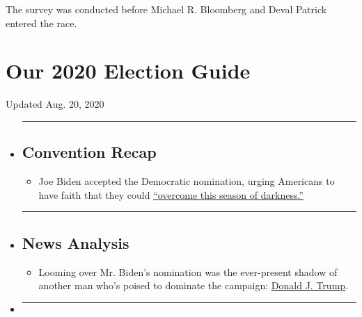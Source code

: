 The survey was conducted before Michael R. Bloomberg and Deval Patrick
entered the race.

\hypertarget{our-2020-election-guide}{%
\section{Our 2020 Election Guide}\label{our-2020-election-guide}}

Updated Aug. 20, 2020

\begin{itemize}
\item
  \begin{center}\rule{0.5\linewidth}{\linethickness}\end{center}

  \hypertarget{convention-recap}{%
  \subsection{Convention Recap}\label{convention-recap}}

  \begin{itemize}
  \tightlist
  \item
    Joe Biden accepted the Democratic nomination, urging Americans to
    have faith that they could
    \href{https://www.nytimes3xbfgragh.onion/2020/08/20/us/politics/Joe-Biden-accepts-democratic-nomination.html?action=click\&pgtype=Article\&state=default\&region=BELOW_MAIN_CONTENT\&context=storylines_guide}{``overcome
    this season of darkness.''}
  \end{itemize}
\item
  \begin{center}\rule{0.5\linewidth}{\linethickness}\end{center}

  \hypertarget{news-analysis}{%
  \subsection{News Analysis}\label{news-analysis}}

  \begin{itemize}
  \tightlist
  \item
    Looming over Mr. Biden's nomination was the ever-present shadow of
    another man who's poised to dominate the campaign:
    \href{https://www.nytimes3xbfgragh.onion/2020/08/20/us/politics/biden-dnc-speech-trump.html?action=click\&pgtype=Article\&state=default\&region=BELOW_MAIN_CONTENT\&context=storylines_guide}{Donald
    J. Trump}.
  \end{itemize}
\item
  \begin{center}\rule{0.5\linewidth}{\linethickness}\end{center}


\end{itemize}
